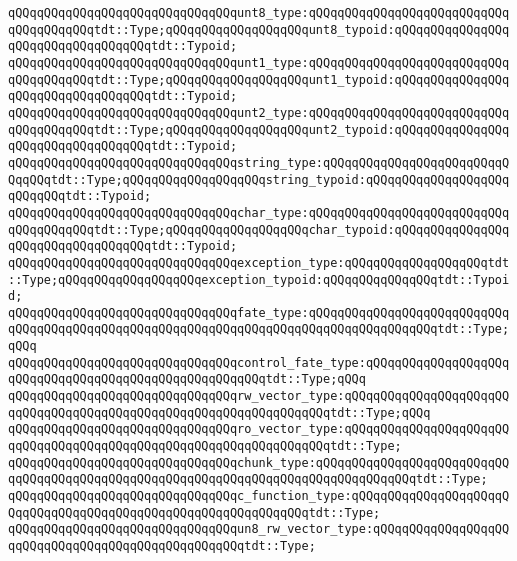 \verb|qQQqqQQqqQQqqQQqqQQqqQQqqQQqqQQqunt8_type:qQQqqQQqqQQqqQQqqQQqqQQqqQQqqQQqqQQqqQQqtdt::Type;qQQqqQQqqQQqqQQqqQQqunt8_typoid:qQQqqQQqqQQqqQQqqQQqqQQqqQQqqQQqqQQqtdt::Typoid;|\newline
\verb|qQQqqQQqqQQqqQQqqQQqqQQqqQQqqQQqunt1_type:qQQqqQQqqQQqqQQqqQQqqQQqqQQqqQQqqQQqqQQqtdt::Type;qQQqqQQqqQQqqQQqqQQqunt1_typoid:qQQqqQQqqQQqqQQqqQQqqQQqqQQqqQQqqQQqtdt::Typoid;|\newline
\verb|qQQqqQQqqQQqqQQqqQQqqQQqqQQqqQQqunt2_type:qQQqqQQqqQQqqQQqqQQqqQQqqQQqqQQqqQQqqQQqtdt::Type;qQQqqQQqqQQqqQQqqQQqunt2_typoid:qQQqqQQqqQQqqQQqqQQqqQQqqQQqqQQqqQQqtdt::Typoid;|\newline
\verb|qQQqqQQqqQQqqQQqqQQqqQQqqQQqqQQqstring_type:qQQqqQQqqQQqqQQqqQQqqQQqqQQqqQQqtdt::Type;qQQqqQQqqQQqqQQqqQQqstring_typoid:qQQqqQQqqQQqqQQqqQQqqQQqqQQqtdt::Typoid;|\newline
\verb|qQQqqQQqqQQqqQQqqQQqqQQqqQQqqQQqchar_type:qQQqqQQqqQQqqQQqqQQqqQQqqQQqqQQqqQQqqQQqtdt::Type;qQQqqQQqqQQqqQQqqQQqchar_typoid:qQQqqQQqqQQqqQQqqQQqqQQqqQQqqQQqqQQqtdt::Typoid;|\newline
\verb|qQQqqQQqqQQqqQQqqQQqqQQqqQQqqQQqexception_type:qQQqqQQqqQQqqQQqqQQqtdt::Type;qQQqqQQqqQQqqQQqqQQqexception_typoid:qQQqqQQqqQQqqQQqtdt::Typoid;|\newline
\newline
\verb|qQQqqQQqqQQqqQQqqQQqqQQqqQQqqQQqfate_type:qQQqqQQqqQQqqQQqqQQqqQQqqQQqqQQqqQQqqQQqqQQqqQQqqQQqqQQqqQQqqQQqqQQqqQQqqQQqqQQqqQQqqQQqtdt::Type;qQQq|\newline
\verb|qQQqqQQqqQQqqQQqqQQqqQQqqQQqqQQqcontrol_fate_type:qQQqqQQqqQQqqQQqqQQqqQQqqQQqqQQqqQQqqQQqqQQqqQQqqQQqqQQqtdt::Type;qQQq|\newline
\verb|qQQqqQQqqQQqqQQqqQQqqQQqqQQqqQQqrw_vector_type:qQQqqQQqqQQqqQQqqQQqqQQqqQQqqQQqqQQqqQQqqQQqqQQqqQQqqQQqqQQqqQQqqQQqtdt::Type;qQQq|\newline
\verb|qQQqqQQqqQQqqQQqqQQqqQQqqQQqqQQqro_vector_type:qQQqqQQqqQQqqQQqqQQqqQQqqQQqqQQqqQQqqQQqqQQqqQQqqQQqqQQqqQQqqQQqqQQqtdt::Type;|\newline
\newline
\verb|qQQqqQQqqQQqqQQqqQQqqQQqqQQqqQQqchunk_type:qQQqqQQqqQQqqQQqqQQqqQQqqQQqqQQqqQQqqQQqqQQqqQQqqQQqqQQqqQQqqQQqqQQqqQQqqQQqqQQqqQQqtdt::Type;|\newline
\verb|qQQqqQQqqQQqqQQqqQQqqQQqqQQqqQQqc_function_type:qQQqqQQqqQQqqQQqqQQqqQQqqQQqqQQqqQQqqQQqqQQqqQQqqQQqqQQqqQQqqQQqtdt::Type;|\newline
\verb|qQQqqQQqqQQqqQQqqQQqqQQqqQQqqQQqun8_rw_vector_type:qQQqqQQqqQQqqQQqqQQqqQQqqQQqqQQqqQQqqQQqqQQqqQQqqQQqtdt::Type;|\newline
